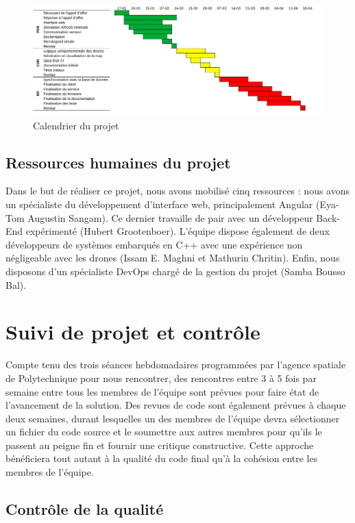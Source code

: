 \documentclass{mistcoursedoc}
\begin{document}
\begin{figure}[h!]
  \centering\includegraphics[width=1\textwidth]{gantt.png}
  \caption{Calendrier du projet}
\end{figure}

\subsection{Ressources humaines du projet}

\par Dans le but de réaliser ce projet, nous avons mobilisé cinq ressources : nous avons un spécialiste du développement d’interface web, principalement Angular (Eya-Tom Augustin Sangam). Ce dernier travaille de pair avec un développeur Back-End expérimenté (Hubert Grootenboer). L’équipe dispose également de deux développeurs de systèmes embarqués en C++ avec une expérience non négligeable avec les drones (Issam E. Maghni et Mathurin Chritin). Enfin, nous disposons d’un spécialiste DevOps chargé de la gestion du projet (Samba Bousso Bal).

\section{Suivi de projet et contrôle}

Compte tenu des trois séances hebdomadaires programmées par l’agence spatiale de Polytechnique pour nous rencontrer, des rencontres entre 3 à 5 fois par semaine entre tous les membres de l’équipe sont prévues pour faire état de l'avancement de la solution. Des revues de code sont également prévues à chaque deux semaines, durant lesquelles un des membres de l'équipe devra sélectionner un fichier du code source et le soumettre aux autres membres pour qu'ils le passent au peigne fin et fournir une critique constructive. Cette approche bénéficiera tout autant à la qualité du code final qu'à la cohésion entre les membres de l'équipe.

\subsection{Contrôle de la qualité}
\end{document}
